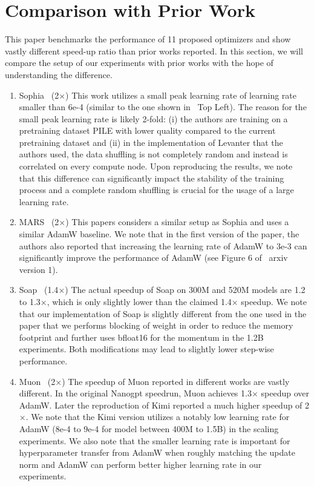 \section{Comparison with Prior Work}
\label{sec:comparison-with-prior}

This paper benchmarks the performance of 11 proposed optimizers and show vastly different speed-up ratio than prior works reported. In this section, we will compare the setup of our experiments with prior works with the hope of understanding the difference.

\begin{enumerate}[leftmargin=*]
    \item Sophia~\cite{liu2024sophiascalablestochasticsecondorder} (2$\times$) This work utilizes a small peak learning rate of learning rate smaller than 6e-4 (similar to the one shown in~ Top Left). The reason for the small peak learning rate is likely 2-fold: (i) the authors are training on a pretraining dataset PILE with lower quality compared to the current pretraining dataset and (ii) in the implementation of Levanter that the authors used, the data shuffling is not completely random and instead is correlated on every compute node. Upon reproducing the results, we note that this difference can significantly impact the stability of the training process and a complete random shuffling is crucial for the usage of a large learning rate.
    \item  MARS~\cite{yuan2025mars} (2$\times$) This papers considers a similar setup as Sophia and uses a similar AdamW baseline. We note that in the first version of the paper, the authors also reported that increasing the learning rate of AdamW to 3e-3 can significantly improve the performance of AdamW (see Figure 6 of~\cite{yuan2025mars} arxiv version 1).
    \item  Soap~\cite{vyas2025soapimprovingstabilizingshampoo} (1.4$\times$) The actual speedup of Soap on 300M and 520M models are 1.2 to 1.3$\times$, which is only slightly lower than the claimed 1.4$\times$ speedup. We note that our implementation of Soap is slightly different from the one used in the paper that we performs blocking of weight in order to reduce the memory footprint and further uses bfloat16 for the momentum in the 1.2B experiments. Both modifications may lead to slightly lower step-wise performance.
    \item Muon~\cite{jordan2024muon,liu2025muonscalablellmtraining} (2$\times$) The speedup of Muon reported in different works are vastly different. In the original Nanogpt speedrun, Muon achieves 1.3$\times$ speedup over AdamW. Later the reproduction of Kimi reported a much higher speedup of 2$\times$. We note that the Kimi version utilizes a notably low learning rate for AdamW (8e-4 to 9e-4 for model between 400M to 1.5B) in the scaling experiments. We also note that the smaller learning rate is important for hyperparameter transfer from AdamW when roughly matching the update norm and AdamW can perform better higher learning rate in our experiments.

\end{enumerate}
